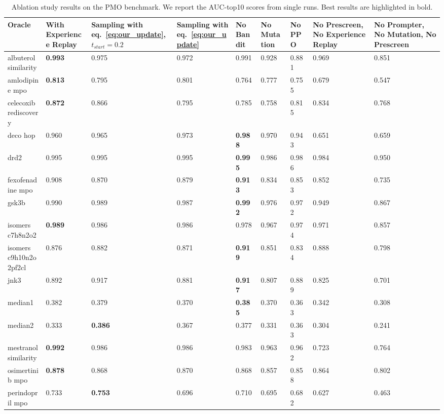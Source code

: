 \documentclass{article} %
\begin{document}
\begin{table}
\centering
\caption{Ablation study results on the PMO benchmark. We report the AUC-top10 scores from single runs. Best results are highlighted in bold.}
\label{tab:ablation}
\begin{tabularx}{\linewidth}{l|Y Y Y Y Y Y Y Y }
\toprule
Oracle & With Experience Replay & Sampling with eq.~\ref{eq:our_update}, $t_{start}=0.2$ & Sampling with eq.~\ref{eq:our_update} & No Bandit & No Mutation & No PPO & No Prescreen, No Experience Replay & No Prompter, No Mutation, No Prescreen \\
\midrule
\small{albuterol similarity} & \textbf{0.993} & 0.975 & 0.972 & 0.991 & 0.928 & 0.881 & 0.969 & 0.851 \\
\small{amlodipine mpo} & \textbf{0.813} & 0.795 & 0.801 & 0.764 & 0.777 & 0.755 & 0.679 & 0.547 \\
\small{celecoxib rediscovery} & \textbf{0.872} & 0.866 & 0.795 & 0.785 & 0.758 & 0.815 & 0.834 & 0.768 \\
\small{deco hop} & 0.960 & 0.965 & 0.973 & \textbf{0.988} & 0.970 & 0.943 & 0.651 & 0.659 \\
\small{drd2} & 0.995 & 0.995 & 0.995 & \textbf{0.995} & 0.986 & 0.986 & 0.984 & 0.950 \\
\small{fexofenadine mpo} & 0.908 & 0.870 & 0.879 & \textbf{0.913} & 0.834 & 0.853 & 0.852 & 0.735 \\
\small{gsk3b} & 0.990 & 0.989 & 0.987 & \textbf{0.992} & 0.976 & 0.972 & 0.949 & 0.867 \\
\small{isomers c7h8n2o2} & \textbf{0.989} & 0.986 & 0.986 & 0.978 & 0.967 & 0.974 & 0.971 & 0.857 \\
\small{isomers c9h10n2o2pf2cl} & 0.876 & 0.882 & 0.871 & \textbf{0.919} & 0.851 & 0.834 & 0.888 & 0.798 \\
\small{jnk3} & 0.892 & 0.917 & 0.881 & \textbf{0.917} & 0.807 & 0.889 & 0.825 & 0.701 \\
\small{median1} & 0.382 & 0.379 & 0.370 & \textbf{0.385} & 0.370 & 0.363 & 0.342 & 0.308 \\
\small{median2} & 0.333 & \textbf{0.386} & 0.367 & 0.377 & 0.331 & 0.363 & 0.304 & 0.241 \\
\small{mestranol similarity} & \textbf{0.992} & 0.986 & 0.986 & 0.983 & 0.963 & 0.962 & 0.723 & 0.764 \\
\small{osimertinib mpo} & \textbf{0.878} & 0.868 & 0.870 & 0.868 & 0.857 & 0.858 & 0.864 & 0.802 \\
\small{perindopril mpo} & 0.733 & \textbf{0.753} & 0.696 & 0.710 & 0.695 & 0.682 & 0.627 & 0.463 \\

\end{tabularx}
\end{table}
\end{document}
